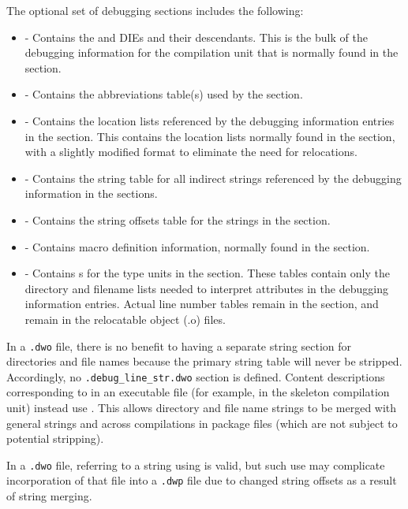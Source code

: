 The optional set of debugging sections includes the following:
\begin{itemize}
\item
\dotdebuginfodwo{} - Contains the \DWTAGcompileunit{} and
\DWTAGtypeunit{} DIEs and
their descendants. This is the bulk of the debugging
information for the compilation unit that is normally found
in the \dotdebuginfo{} section.
\item
\dotdebugabbrevdwo{} - Contains the abbreviations table(s) used by
the \dotdebuginfodwo{} section.
\item
\dotdebuglocdwo{} - Contains the location lists referenced by
the debugging information entries in the \dotdebuginfodwo{}
section. This contains the location lists normally found in 
the \dotdebugloc{} section,
with a slightly modified format to eliminate the need for
relocations.
\item
\dotdebugstrdwo{} - Contains the string table for all indirect
strings referenced by the debugging information in the
\dotdebuginfodwo{} sections.
\item
\dotdebugstroffsetsdwo{} - Contains the string offsets table
for the strings in the \dotdebugstrdwo{}{} section.
\item
\dotdebugmacrodwo{} - Contains macro definition information,
normally found in the \dotdebugmacro{} section.
\item
\dotdebuglinedwo{} - Contains s 
for the type units in the \dotdebuginfodwo{} section. These tables
contain only the directory and filename lists needed to
interpret \DWATdeclfile{} attributes in the debugging
information entries. Actual line number tables remain in the
\dotdebugline{} section, and remain in the relocatable object
(.o) files.

\end{itemize}

In a \texttt{.dwo} file, there is no benefit to having a separate string
section for directories and file names because the primary
string table will never be stripped. Accordingly, no
\texttt{.debug\_line\_str.dwo} section is defined. Content descriptions 
corresponding to \DWFORMlinestrp{} in an executable file (for example, 
in the skeleton compilation unit) instead use \DWFORMstrx. This allows
directory and file name strings to be merged with general
strings and across compilations in package files (which are not
subject to potential stripping).

In a \texttt{.dwo} file, referring to a string using \DWFORMstrp{}
is valid, but such use may complicate incorporation of that file into a
\texttt{.dwp} file due to changed string offsets as a result of string merging.

